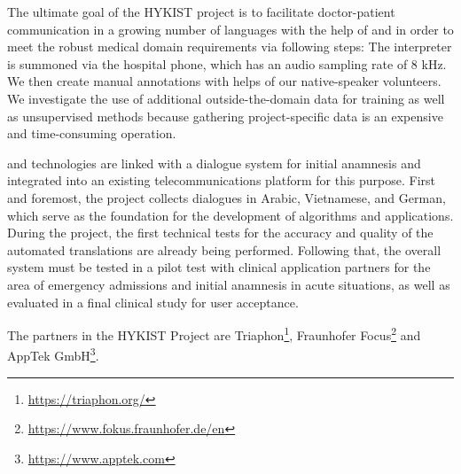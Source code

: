 The ultimate goal of the HYKIST project is to facilitate doctor-patient communication in a growing number of languages with the help of  and  in order to meet the robust medical domain requirements via following steps: 
The interpreter is summoned via the hospital phone, which has an audio sampling rate of 8 kHz. 
We then create manual annotations with helps of our native-speaker volunteers. 
We investigate the use of additional outside-the-domain data for training as well as unsupervised methods because gathering project-specific data is an expensive and time-consuming operation.

 and  technologies are linked with a dialogue system for initial anamnesis and integrated into an existing telecommunications platform for this purpose. 
First and foremost, the project collects dialogues in Arabic, Vietnamese, and German, which serve as the foundation for the development of algorithms and applications. 
During the project, the first technical tests for the accuracy and quality of the automated translations are already being performed. 
Following that, the overall system must be tested in a pilot test with clinical application partners for the area of emergency admissions and initial anamnesis in acute situations, as well as evaluated in a final clinical study for user acceptance.

The partners in the HYKIST Project are Triaphon\footnote{\href{https://triaphon.org/}{https://triaphon.org/}}, Fraunhofer Focus\footnote{\href{https://www.fokus.fraunhofer.de/en}{https://www.fokus.fraunhofer.de/en}} and AppTek GmbH\footnote{\href{https://www.apptek.com}{https://www.apptek.com}}.

\pagebreak
